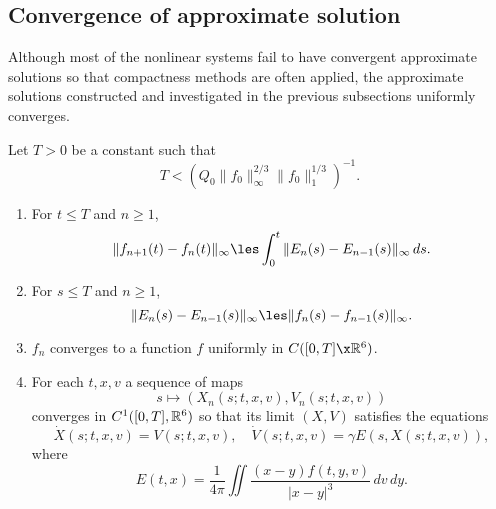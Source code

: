 \documentclass[11pt]{amsart}
\begin{document}
\subsection{Convergence of approximate solution}
Although most of the nonlinear systems fail to have convergent approximate solutions so that compactness methods are often applied, the approximate solutions constructed and investigated in the previous subsections uniformly converges.
\begin{lem}
Let $T>0$ be a constant such that
\[T<(Q_0\|f_0\|_\infty^{2/3}\|f_0\|_1^{1/3})^{-1}.\]
\begin{enumerate}
\item
For $t\le T$ and $n\ge1$,
\[\|f_{n+1}(t)-f_n(t)\|_\infty\les\int_0^t\|E_n(s)-E_{n-1}(s)\|_\infty\,ds.\]
\item
For $s\le T$ and $n\ge1$,
\[\|E_n(s)-E_{n-1}(s)\|_\infty\les\|f_n(s)-f_{n-1}(s)\|_\infty.\]
\item $f_n$ converges to a function $f$ uniformly in $C([0,T]\x\R^6)$.
\item For each $t,x,v$ a sequence of maps
\[s\mapsto(X_n(s;t,x,v),V_n(s;t,x,v))\]
converges in $C^1([0,T],\mathbb{R}^6)$ so that its limit $(X,V)$ satisfies the equations
\[\dot X(s;t,x,v)=V(s;t,x,v),\quad\dot V(s;t,x,v)=\gamma E(s,X(s;t,x,v)),\]
where
\[E(t,x)=\frac1{4\pi}\iint\frac{(x-y)f(t,y,v)}{|x-y|^3}\,dv\,dy.\]
\end{enumerate}
\end{lem}
\end{document}
